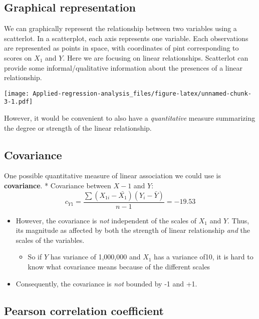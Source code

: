 \documentclass[
]{book}
\providecommand{\tightlist}{%
  \setlength{\itemsep}{0pt}\setlength{\parskip}{0pt}}
\begin{document}
\hypertarget{graphical-representation}{%
\subsection{Graphical representation}\label{graphical-representation}}

We can graphically represent the relationship between two variables using a scatterlot. In a scatterplot, each axis represents one variable. Each observations are represented as points in space, with coordinates of pint corresponding to scores on \(X_1\) and \(Y\). Here we are focusing on linear relationships. Scatterlot can provide some informal/qualitative information about the presences of a linear relationship.

\texttt{[image: Applied-regression-analysis\_files/figure-latex/unnamed-chunk-3-1.pdf]}

However, it would be convenient to also have a \emph{quantitative} measure summarizing the degree or strength of the linear relationship.

\hypertarget{covariance}{%
\subsection{Covariance}\label{covariance}}

One possible quantitative measure of linear association we could use is \textbf{covariance}.
* Covariance between \(X-1\) and \(Y\):
\[
c_{Y1} = \frac{\sum{(X_{1i} - \bar{X_1})(Y_{i} - \bar{Y})}}{n-1} = -19.53
\]

\begin{itemize}
\tightlist
\item
  However, the covariance is \emph{not} independent of the scales of \(X_1\) and \(Y\). Thus, its magnitude as affected by both the strength of linear relationship \emph{and} the scales of the variables.

  \begin{itemize}
  \tightlist
  \item
    So if \(Y\) has variance of 1,000,000 and \(X_1\) has a variance of10, it is hard to know what covariance means because of the different scales
  \end{itemize}
\item
  Consequently, the covariance is \emph{not} bounded by -1 and +1.
\end{itemize}

\hypertarget{pearson-correlation-coefficient}{%
\subsection{Pearson correlation coefficient}\label{pearson-correlation-coefficient}}
\end{document}
